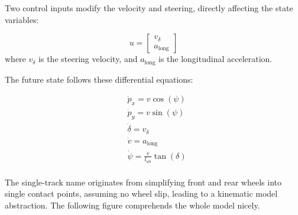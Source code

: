 Two control inputs modify the velocity and steering, directly affecting the state variables:

\begin{equation}
	u = \begin{bmatrix} v_{\delta} \\ a_{\text{long}} \end{bmatrix}
	\label{eq:controls_kst}
\end{equation}
where $v_{\delta}$ is the steering velocity, and $a_{\text{long}}$ is the longitudinal acceleration.

The future state follows these differential equations:

\begin{align}
	 & \dot{p}_x = v\cos(\psi)                    \\
	 & \dot{p}_y = v\sin(\psi)                    \\
	 & \dot{\delta} = v_{\delta}                  \\
	 & \dot{v} = a_{\text{long}}                  \\
	 & \dot{\psi} = \frac{v}{l_{wb}} \tan(\delta) \\
\end{align}

The single-track name originates from simplifying front and rear wheels into single contact points, assuming no wheel slip, leading to a kinematic
model abstraction.
The following figure comprehends the whole model nicely.

